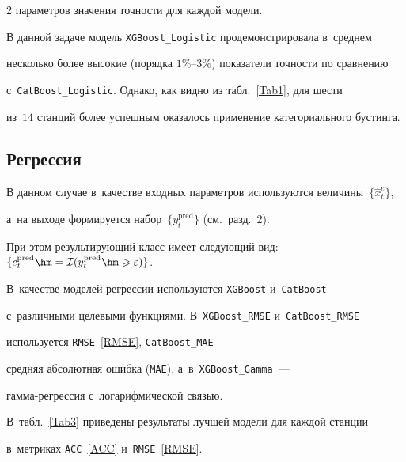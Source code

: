 \begin{multicols}{2}
параметров значения точности для каж\-дой модели.



В данной задаче модель \verb"XGBoost_Logistic" продемонстрировала в~среднем 

несколько более высокие (порядка $1\%\mbox{--}3\%$) показатели точ\-ности по сравнению

 с~\verb"CatBoost_Logistic". Однако, как видно из табл.~\ref{Tab1}, для шести 

 из~$14$  станций более успешным оказалось применение категориального бустинга.



\subsection{Регрессия}



В данном случае в~качестве входных параметров используются величины~$\{\hat{x}^e_t\}$, 

а~на выходе формируется набор~$\{y^{\mathrm{pred}}_t\}$ (см.\ разд.~2). 

При этом результирующий класс имеет следующий вид: $\{ c^{\mathrm{pred}}_t \hm=

\mathcal {I} (y^{\mathrm{pred}}_t\hm\geqslant \varepsilon)\}$. 

В~качестве моделей регрессии используются \verb"XGBoost" и~\verb"CatBoost" 

с~различными целевыми функциями. В~\verb"XGBoost_RMSE" и~\verb"CatBoost_RMSE" 

используется \verb"RMSE"~\eqref{RMSE}, \verb"CatBoost_MAE"~--- 

средняя абсолютная ошибка (\verb"MAE"), а~в~\verb"XGBoost_Gamma"~--- 

гам\-ма-ре\-грес\-сия с~логарифмической связью. 

В~табл.~\ref{Tab3} приведены результаты лучшей модели для каждой станции 

в~метриках \verb"ACC"~\eqref{ACC} и~\verb"RMSE"~\eqref{RMSE}.



\setcounter{table}{3}

\begin{table}\small %

\begin{center}


\vspace*{2ex}




\end{center}
\end{table}
\end{multicols}
